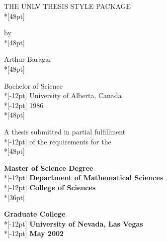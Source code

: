 \thispagestyle{empty}%
 \begin{center}
 THE UNLV THESIS STYLE PACKAGE\\*[48pt]%

\normalsize by\\*[48pt]

 Arthur Baragar\\*[48pt]

 Bachelor of Science\\*[-12pt]%
 University of Alberta, Canada\\*[-12pt]
 1986\\*[48pt]


 A thesis submitted in partial fulfillment\\*[-12pt]
 of the requirements for the\\*[48pt]


 {\bf Master of Science Degree} \\*[-12pt]
 {\bf Department of Mathematical Sciences}\\*[-12pt]
 {\bf College of Sciences}\\*[36pt]

\normalsize
 {\bf Graduate College}\\*[-12pt]
 {\bf University of Nevada, Las Vegas}\\*[-12pt]
 {\bf May 2002}
\end{center}

